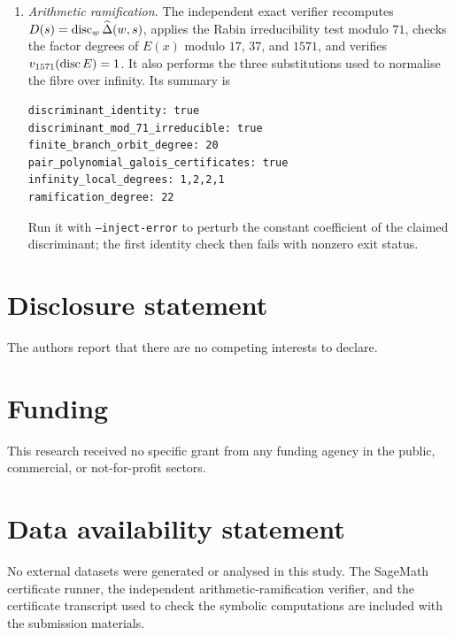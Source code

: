 \begin{enumerate}[label=(\alph*)]
    \medskip
    \noindent\textit{Sage commands.}
\begin{verbatim}
R.<t,a1,a2,a3,a4,a5,a6> = QQ[]
w = 1/3 + a1*t + a2*t^2 + a3*t^3 + a4*t^4 + a5*t^5 + a6*t^6
s = 2 + t
H = 1 - s*w - 5*w^2 + 3*s*w^3 + (5 - s^2)*w^4 \
    + (s^3 - 6*s)*w^5 + (s^2 - 1)*w^6
[H.monomial_coefficient(t^n) for n in range(1, 7)]
# solve successively for a1,...,a6, then invert 1/w to order 6
\end{verbatim}

  \item \textit{Arithmetic ramification.}\quad
    The independent exact verifier recomputes
    \(D(s)=\operatorname{disc}_w\widehat\Delta(w,s)\), applies the Rabin
    irreducibility test modulo \(71\), checks the factor degrees of
    \(E(x)\) modulo \(17\), \(37\), and \(1571\), and verifies
    \(v_{1571}(\operatorname{disc} E)=1\). It also performs the three substitutions
    used to normalise the fibre over infinity. Its summary is
\begin{verbatim}
discriminant_identity: true
discriminant_mod_71_irreducible: true
finite_branch_orbit_degree: 20
pair_polynomial_galois_certificates: true
infinity_local_degrees: 1,2,2,1
ramification_degree: 22
\end{verbatim}
    Run it with \texttt{--inject-error} to perturb the constant
    coefficient of the claimed discriminant; the first identity check
    then fails with nonzero exit status.
\end{enumerate}

\section*{Disclosure statement}
The authors report that there are no competing interests to declare.

\section*{Funding}
This research received no specific grant from any funding agency in the
public, commercial, or not-for-profit sectors.

\section*{Data availability statement}
No external datasets were generated or analysed in this study.  The
SageMath certificate runner, the independent arithmetic-ramification
verifier, and the certificate transcript used to check the symbolic
computations are included with the submission materials.

